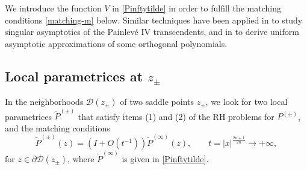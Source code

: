 \documentclass[11pt,a4paper]{article}
\numberwithin{equation}{section}
\begin{document}
We introduce the function $V$ in \eqref{Pinftytilde} in order to fulfill the matching conditions \eqref{matching-m} below. Similar techniques have been applied in \cite{XXZ2021} to study singular asymptotics of  the Painlev\'{e} IV transcendents, and in \cite{ZXZ2011,ZZ2008} to derive uniform asymptotic approximations of some orthogonal polynomials.


\subsection{Local parametrices at $z_{\pm}$}
In the neighborhoods $\mathcal{D}(z_{\pm})$ of two saddle points $z_{\pm}$, we look for two local parametrices $\widetilde{P}^{(\pm)}$ that satisfy items (1) and (2) of the RH problems for $P^{(\pm)}$, and the  matching conditions
\begin{equation}\label{matching-m}
\widetilde{P}^{(\pm)}(z)=\left(I+O(t^{-1})\right)\widetilde{P}^{(\infty)}(z),   \qquad  t=|x|^{\frac{2n+1}{2n}}\to+\infty,
\end{equation}
for $z \in \partial\mathcal{D}(z_{\pm})$, where $\widetilde{P}^{(\infty)}$ is given in \eqref{Pinftytilde}.
%
%
\end{document}
